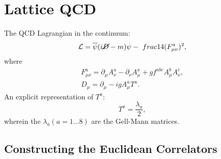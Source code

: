 \chapter{Lattice QCD}

The QCD Lagrangian in the continuum:
\begin{equation}
    \mathcal{L}=\overline{\psi}(i\cancel{D}-m)\psi - \                                                                                                                                                                                                                                 frac{1}{4}(F^a_{\mu\nu})^2,
\end{equation}
where
\begin{gather}
    F^a_{\mu\nu}=\partial_\mu A_\nu^a - \partial_\nu A_\mu^a + gf^{abc}A_\mu^b A_\nu^c, \\
    D_\mu = \partial_\mu - ig A_\mu^aT^a.
\end{gather}
An explicit representation of $T^a$: 
\begin{equation}
    T^a = \frac{\lambda_a}{2},
\end{equation}
wherein the $\lambda_a(a=1\dots 8)$ are the Gell-Mann matrices.

\section{Constructing the Euclidean Correlators}